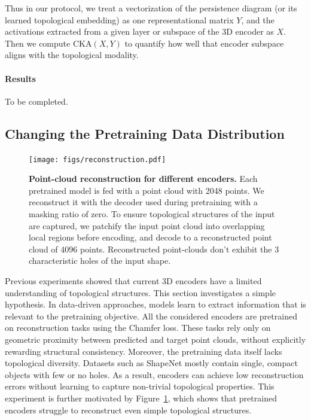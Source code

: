 Thus in our protocol, we treat a vectorization of the persistence diagram (or its learned topological embedding) as one representational matrix $Y$, and the activations extracted from a given layer or subspace of the 3D encoder as $X$. Then we compute $\mathrm{CKA}(X,Y)$ to quantify how well that encoder subspace aligns with the topological modality.

\paragraph{Results}
To be completed.

\subsection{Changing the Pretraining Data Distribution}
\label{ssec:changing_pretraining_data_distribution}

\begin{figure}[h]
  \centering
  
  \texttt{[image: figs/reconstruction.pdf]}
  \caption{\textbf{Point-cloud reconstruction for different encoders.} Each pretrained model is fed with a point cloud with 2048 points. We reconstruct it with the decoder used during pretraining with a masking ratio of zero. To ensure topological structures of the input are captured, we patchify the input point cloud into overlapping local regions before encoding, and decode to a reconstructed point cloud of 4096 points. Reconstructed point-clouds don't exhibit the 3 characteristic holes of the input shape.}
  \label{fig:reconstructions}
\end{figure}


Previous experiments showed that current 3D encoders have a limited understanding of topological structures. This section investigates a simple hypothesis. In data-driven approaches, models learn to extract information that is relevant to the pretraining objective. All the considered encoders are pretrained on reconstruction tasks using the Chamfer loss. These tasks rely only on geometric proximity between predicted and target point clouds, without explicitly rewarding structural consistency. Moreover, the pretraining data itself lacks topological diversity. Datasets such as ShapeNet mostly contain single, compact objects with few or no holes. As a result, encoders can achieve low reconstruction errors without learning to capture non-trivial topological properties. This experiment is further motivated by Figure~\ref{fig:reconstructions}, which shows that pretrained encoders struggle to reconstruct even simple topological structures.

